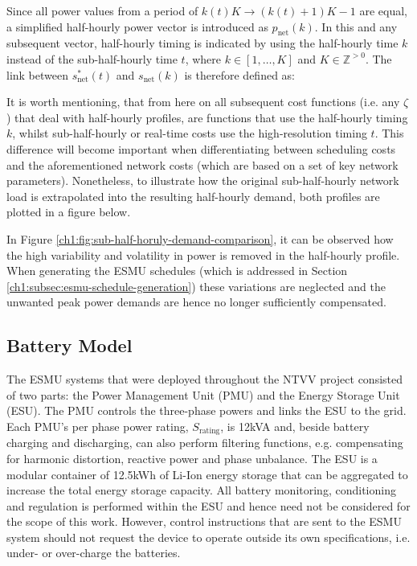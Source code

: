 

Since all power values from a period of $k(t)K \rightarrow (k(t)+1)K-1$ are equal, a simplified half-hourly power vector is introduced as $p_\text{net}(k)$. 
In this and any subsequent vector, half-hourly timing is indicated by using the half-hourly time $k$ instead of the sub-half-hourly time $t$, where $k \in [1, \dots, K]$ and $K \in \mathbb{Z}^{>0}$.
The link between $s^{*}_\text{net}(t)$ and $s_\text{net}(k)$ is therefore defined as:



It is worth mentioning, that from here on all subsequent cost functions (i.e. any $\zeta$) that deal with half-hourly profiles, are functions that use the half-hourly timing $k$, whilst sub-half-hourly or real-time costs use the high-resolution timing $t$.
This difference will become important when differentiating between scheduling costs and the aforementioned network costs (which are based on a set of key network parameters).
Nonetheless, to illustrate how the original sub-half-hourly network load is extrapolated into the resulting half-hourly demand, both profiles are plotted in a figure below.



In Figure \ref{ch1:fig:sub-half-horuly-demand-comparison}, it can be observed how the high variability and volatility in power is removed in the half-hourly profile.
When generating the ESMU schedules (which is addressed in Section \ref{ch1:subsec:esmu-schedule-generation}) these variations are neglected and the unwanted peak power demands are hence no longer sufficiently compensated.

\subsection{Battery Model}


The ESMU systems that were deployed throughout the NTVV project consisted of two parts: the Power Management Unit (PMU) and the Energy Storage Unit (ESU).
The PMU controls the three-phase powers and links the ESU to the grid.
Each PMU's per phase power rating, $S_\text{rating}$, is 12kVA and, beside battery charging and discharging, can also perform filtering functions, e.g. compensating for harmonic distortion, reactive power and phase unbalance.
The ESU is a modular container of 12.5kWh of Li-Ion energy storage that can be aggregated to increase the total energy storage capacity.
All battery monitoring, conditioning and regulation is performed within the ESU and hence need not be considered for the scope of this work.
However, control instructions that are sent to the ESMU system should not request the device to operate outside its own specifications, i.e. under- or over-charge the batteries.

